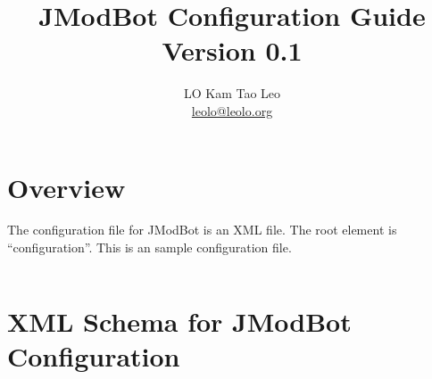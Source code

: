 \documentclass{report}
\title{JModBot Configuration Guide\\Version 0.1}
\author{LO Kam Tao Leo\\\href{mailto:leolo@leolo.org}{leolo@leolo.org}}
\begin{document}
	\maketitle
	\tableofcontents
	\chapter{Overview}
	The configuration file for JModBot is an XML file. The root element is ``configuration''. This is an sample configuration file.
	\inputminted[linenos]{xml}{bot.sample.xml}
	\chapter{XML Schema for JModBot Configuration}
	\inputminted[linenos]{xml}{config.xsd}
\end{document}
